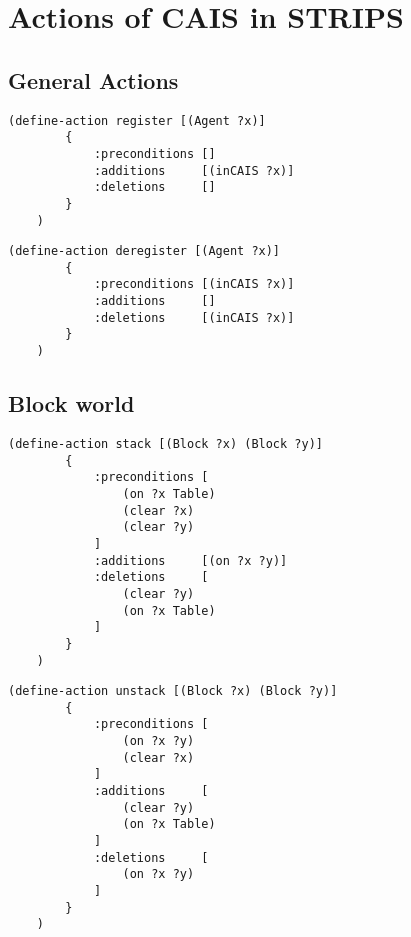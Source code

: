  
\appendix    %

\chapter{Actions of CAIS in STRIPS}\label{apdx:strips}

\section{General Actions}

\begin{lstlisting}[caption=register]
    (define-action register [(Agent ?x)]
        {
            :preconditions []
            :additions     [(inCAIS ?x)]
            :deletions     []
        }
    )
\end{lstlisting}

\begin{lstlisting}[caption=deregister]
    (define-action deregister [(Agent ?x)]
        {
            :preconditions [(inCAIS ?x)]
            :additions     []
            :deletions     [(inCAIS ?x)]
        }
    )
\end{lstlisting}

\section{Block world}

\begin{lstlisting}[caption=stack]
    (define-action stack [(Block ?x) (Block ?y)]
        {
            :preconditions [
                (on ?x Table)
                (clear ?x)
                (clear ?y)
            ]
            :additions     [(on ?x ?y)]
            :deletions     [
                (clear ?y)
                (on ?x Table)
            ]
        }
    )
\end{lstlisting}

\begin{lstlisting}[caption=unstack]
    (define-action unstack [(Block ?x) (Block ?y)]
        {
            :preconditions [
                (on ?x ?y)
                (clear ?x)
            ]
            :additions     [
                (clear ?y)
                (on ?x Table)
            ]
            :deletions     [
                (on ?x ?y)
            ]
        }
    )
\end{lstlisting}

